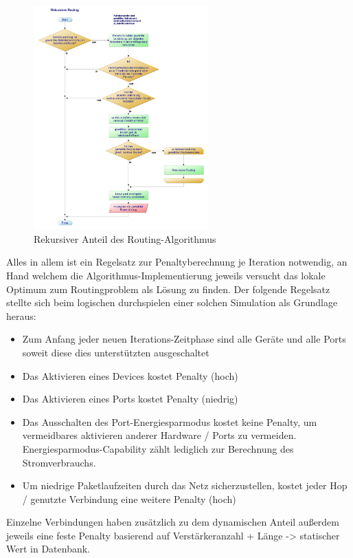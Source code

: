 \documentclass[12pt,titlepage]{article}
\begin{document}
\begin{figure}[!h]
	\centering
	\includegraphics[width=0.6\textwidth]{3Rekursives_Routing}
	\caption{Rekursiver Anteil des Routing-Algorithmus}
	\label{fig:3Rekursives_Routing}
\end{figure}

Alles in allem ist ein Regelsatz zur Penaltyberechnung je Iteration notwendig, an Hand welchem die Algorithmus-Implementierung jeweils versucht das lokale Optimum zum Routingproblem als Lösung zu finden.
Der folgende Regelsatz stellte sich beim logischen durchspielen einer solchen Simulation als Grundlage heraus:
\begin{itemize}
\item Zum Anfang jeder neuen Iterations-Zeitphase sind alle Geräte und alle Ports soweit diese dies unterstützten ausgeschaltet
\item Das Aktivieren eines Devices kostet Penalty (hoch)
\item Das Aktivieren eines Ports kostet Penalty (niedrig)
\item Das Ausschalten des Port-Energiesparmodus kostet keine Penalty, um vermeidbares aktivieren anderer Hardware / Ports zu vermeiden. Energiesparmodus-Capability zählt lediglich zur Berechnung des Stromverbrauchs.
\item Um niedrige Paketlaufzeiten durch das Netz sicherzustellen, kostet jeder Hop / genutzte Verbindung eine weitere Penalty (hoch)
\end{itemize}
Einzelne Verbindungen haben zusätzlich zu dem dynamischen Anteil außerdem jeweils eine feste Penalty basierend auf Verstärkeranzahl + Länge -> statischer Wert in Datenbank.
\end{document}
